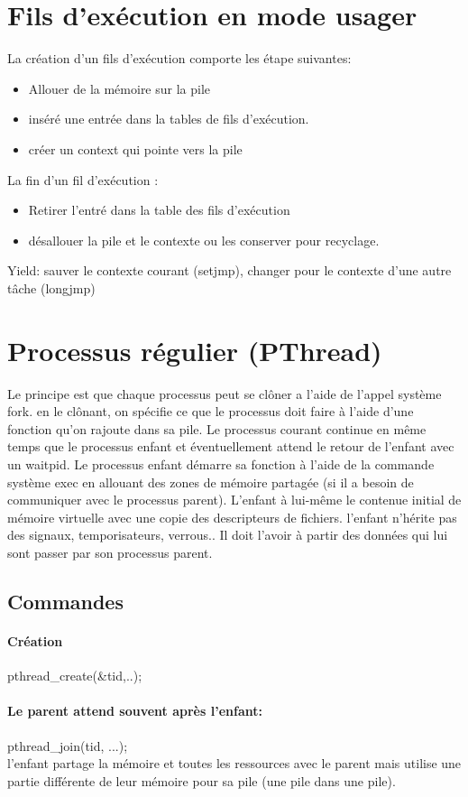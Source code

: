 \documentclass[oneside]{book}
\begin{document}
\section{Fils d'exécution en mode usager}
La création d'un fils d'exécution comporte les étape suivantes:
\begin{itemize}
\item Allouer de la mémoire sur la pile
\item inséré une entrée dans la tables de fils d'exécution.
\item créer un context qui pointe vers la pile
\end{itemize}
La fin d'un fil d'exécution : 
\begin{itemize}
\item Retirer l'entré dans la table des fils d'exécution
\item désallouer la pile et le contexte ou les conserver pour recyclage.
\end{itemize}
Yield: sauver le contexte courant (setjmp), changer pour le contexte d'une autre tâche (longjmp)

\section{Processus régulier (PThread)}
Le principe est que chaque processus peut se clôner a l'aide de l'appel système fork. en le clônant, on spécifie ce que le processus doit faire à l'aide d'une fonction qu'on rajoute dans sa pile. Le processus courant continue en même temps que le processus enfant et éventuellement attend le retour de l'enfant avec un waitpid. Le processus enfant démarre sa fonction à l'aide de la commande système exec en allouant des zones de mémoire partagée (si il a besoin de communiquer avec le processus parent). L'enfant à lui-même le contenue initial de mémoire virtuelle avec une copie des descripteurs de fichiers. l'enfant n'hérite pas des signaux, temporisateurs, verrous.. Il doit l'avoir à partir des données qui lui sont passer par son processus parent. \\
\subsection{Commandes}
\paragraph{Création}pthread\_create(\&tid,..);
\paragraph{Le parent attend souvent après l'enfant:} pthread\_join(tid, ...);\\
l'enfant partage la mémoire et toutes les ressources avec le parent mais utilise une partie différente de leur mémoire pour sa pile (une pile dans une pile).\\
\end{document}
